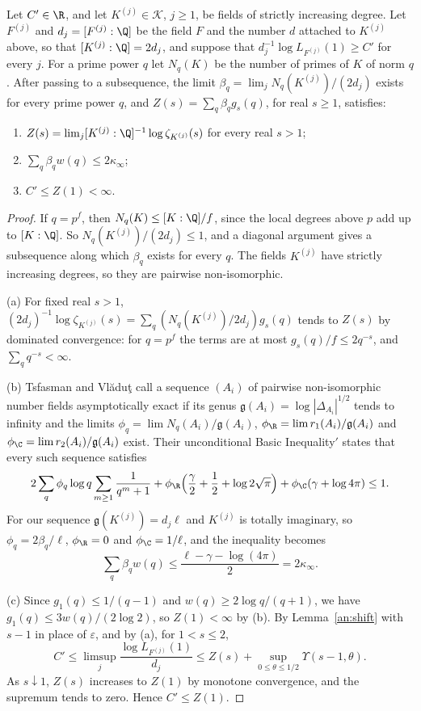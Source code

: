\begin{lemma}\label{an:limit}
Let $C'\in\R$, and let $K^{(j)}\in\mathcal K$, $j\ge1$, be fields of strictly
increasing degree. Let $F^{(j)}$ and $d_j=[F^{(j)}:\Q]$ be the field $F$ and
the number $d$ attached to $K^{(j)}$ above, so that $[K^{(j)}:\Q]=2d_j$, and
suppose that $d_j^{-1}\log L_{F^{(j)}}(1)\ge C'$ for every $j$. For a prime
power $q$ let $N_q(K)$ be the number of
primes of $K$ of norm $q$. After passing to a subsequence, the limit
$\beta_q=\lim_jN_q(K^{(j)})/(2d_j)$ exists for every prime power $q$, and
$Z(s)=\sum_q\beta_qg_s(q)$, for real $s\ge1$, satisfies:
\begin{enumerate}
\item[(a)] $Z(s)=\lim_j[K^{(j)}:\Q]^{-1}\log\zeta_{K^{(j)}}(s)$ for every
 real $s>1$;
\item[(b)] $\sum_q\beta_qw(q)\le2\kappa_\infty$;
\item[(c)] $C'\le Z(1)<\infty$.
\end{enumerate}
\end{lemma}

\begin{proof}
If $q=p^f$, then $N_q(K)\le[K:\Q]/f$, since the local degrees above $p$ add
up to $[K:\Q]$. So $N_q(K^{(j)})/(2d_j)\le1$, and a diagonal argument gives
a subsequence along which $\beta_q$ exists for every $q$. The fields
$K^{(j)}$ have strictly increasing degrees, so they are pairwise
non-isomorphic.

(a) For fixed real $s>1$,
$(2d_j)^{-1}\log\zeta_{K^{(j)}}(s)=\sum_q(N_q(K^{(j)})/2d_j)g_s(q)$ tends to
$Z(s)$ by dominated convergence: for $q=p^f$ the terms are at most
$g_s(q)/f\le2q^{-s}$, and $\sum_qq^{-s}<\infty$.

(b) Tsfasman and Vl\u{a}du\c{t} call a sequence $(A_i)$ of pairwise
non-isomorphic number fields asymptotically exact if its genus
$\mathfrak g(A_i)=\log|\Delta_{A_i}|^{1/2}$ tends to infinity and the limits
$\phi_q=\lim N_q(A_i)/\mathfrak g(A_i)$,
$\phi_\R=\lim r_1(A_i)/\mathfrak g(A_i)$ and
$\phi_\C=\lim r_2(A_i)/\mathfrak g(A_i)$ exist. Their unconditional Basic
Inequality$'$ \cite[Section~3.2, Proposition~3.1]{TsfasmanVladut2002} states
that every such sequence satisfies
\[
 2\sum_q\phi_q\log q\sum_{m\ge1}\frac1{q^m+1}
 +\phi_\R\Bigl(\frac\gamma2+\frac12+\log2\sqrt\pi\Bigr)
 +\phi_\C(\gamma+\log4\pi)\le1.
\]
For our sequence $\mathfrak g(K^{(j)})=d_j\ell$ and $K^{(j)}$ is totally
imaginary, so $\phi_q=2\beta_q/\ell$, $\phi_\R=0$ and $\phi_\C=1/\ell$, and
the inequality becomes
\begin{equation}\label{an:tv-budget}
 \sum_q\beta_qw(q)\le\frac{\ell-\gamma-\log(4\pi)}2=2\kappa_\infty.
\end{equation}

(c) Since $g_1(q)\le1/(q-1)$ and $w(q)\ge2\log q/(q+1)$, we have
$g_1(q)\le3w(q)/(2\log2)$, so $Z(1)<\infty$ by (b). By
Lemma~\ref{an:shift} with $s-1$ in place of $\varepsilon$, and by (a), for
$1<s\le2$,
\[
 C'\le\limsup_j\frac{\log L_{F^{(j)}}(1)}{d_j}
 \le Z(s)+\sup_{0\le\theta\le1/2}\Upsilon(s-1,\theta).
\]
As $s\downarrow1$, $Z(s)$ increases to $Z(1)$ by monotone convergence, and
the supremum tends to zero. Hence $C'\le Z(1)$.
\end{proof}

